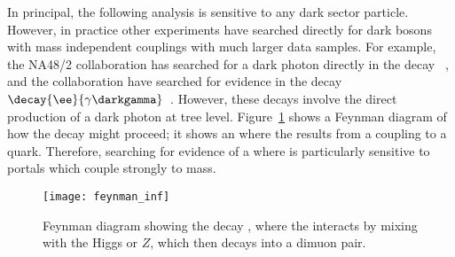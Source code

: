 In principal, the following analysis is sensitive to any dark sector particle.
However, in practice other experiments have searched directly for dark bosons with mass independent
couplings with much larger data samples.
For example, the NA48/2 collaboration has searched for a dark photon directly in the decay
\decay{\piz}{\gamma\darkgamma}~\cite{CERNNA48/2:2015lha}, and the \babar collaboration have
searched for evidence in the decay $\decay{\ee}{\gamma\darkgamma}$~\cite{Lees:2014xha}.
However, these decays involve the direct production of a dark photon at tree level.
Figure~\ref{fig:db:feynman} shows a Feynman diagram of how the decay \btokstrdb might proceed;
it shows an \fcnc where the \db results from a coupling to a \tquark quark.
Therefore, searching for evidence of a \btokstrdb where \dbtomumu is particularly sensitive to
portals which couple strongly to mass.


\begin{figure}
  \begin{center}
    \texttt{[image: feynman\_inf]}
    \caption{
      Feynman diagram showing the decay \btokstrdb, where the \db interacts by mixing with the
      Higgs or $Z$, which then decays into a dimuon pair.
    }
    \label{fig:db:feynman}
  \end{center}
\end{figure}



